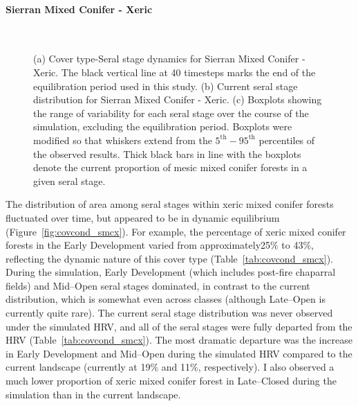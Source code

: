\paragraph*{Sierran Mixed Conifer - Xeric}

\begin{figure}[!htbp]
  \centering
   \\
  \caption{(a) Cover type-Seral stage dynamics for Sierran Mixed Conifer - Xeric. The black vertical line at 40 timesteps marks the end of the equilibration period used in this study. (b) Current seral stage distribution for Sierran Mixed Conifer - Xeric. (c) Boxplots showing the range of variability for each seral stage over the course of the simulation, excluding the equilibration period. Boxplots were modified so that whiskers extend from the $5^{\text{th}} - 95^{\text{th}}$ percentiles of the observed results. Thick black bars in line with the boxplots denote the current proportion of mesic mixed conifer forests in a given seral stage.}  
  \label{fig:hrv-covcond_smcx}
\end{figure}

The distribution of area among seral stages within xeric mixed conifer forests fluctuated over time, but appeared to be in dynamic equilibrium (Figure~\ref{fig:covcond_smcx}). For example, the percentage of xeric mixed conifer forests in the Early Development varied from approximately25\% to 43\%, reflecting the dynamic nature of this cover type (Table~\ref{tab:covcond_smcx}). During the simulation, Early Development (which includes post-fire chaparral fields) and Mid--Open seral stages dominated, in contrast to the current distribution, which is somewhat even across classes (although Late--Open is currently quite rare).
%
The current seral stage distribution was never observed under the simulated HRV, and all of the seral stages were fully departed from the HRV (Table~\ref{tab:covcond_smcx}). The most dramatic departure was the increase in Early Development and Mid--Open during the simulated HRV compared to the current landscape (currently at 19\% and 11\%, respectively). I also observed a much lower proportion of xeric mixed conifer forest in Late--Closed during the simulation than in the current landscape. 

